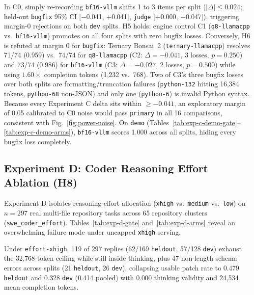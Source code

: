 \documentclass[conference]{IEEEtran}
\begin{document}
In C0, simply re-recording \texttt{bf16-{}vllm} shifts 1 to 3 items per split ($|\Delta| \le 0.024$; held-out \texttt{bugfix} 95\% CI [$-$0.041, +0.041], \texttt{judge} [+0.000, +0.047]), triggering margin-0 rejections on both \texttt{dev} splits. H5 holds: engine control C1 (\texttt{q8-{}llamacpp} vs.\ \texttt{bf16-{}vllm}) promotes on all four splits with zero bugfix losses. Conversely, H6 is refuted at margin 0 for \texttt{bugfix}: Ternary Bonsai~2 (\texttt{ternary-{}llamacpp}) resolves 71/74 (0.959) vs.\ 74/74 for \texttt{q8-{}llamacpp} (C2: $\Delta=-0.041$, 3 losses, $p=0.250$) and 73/74 (0.986) for \texttt{bf16-{}vllm} (C3: $\Delta=-0.027$, 2 losses, $p=0.500$) while using $1.60\times$ completion tokens (1,232 vs.\ 768). Two of C3's three bugfix losses over both splits are formatting/truncation failures (\texttt{python-{}132} hitting 16,384 tokens, \texttt{python-{}68} non-JSON) and only one (\texttt{python-{}6}) is invalid Python syntax. Because every Experiment C delta sits within $\ge -0.041$, an exploratory margin of 0.05 calibrated to C0 noise would pass \texttt{primary} in all 16 comparisons, consistent with Fig.~\ref{fig:power-noise}. On \texttt{demo} (Tables~\ref{tab:exp-c-demo-gate}--\ref{tab:exp-c-demo-arms}), \texttt{bf16-{}vllm} scores 1.000 across all splits, hiding every bugfix loss completely.

\subsection{Experiment D: Coder Reasoning Effort Ablation (H8)}
\label{sec:results-expd}

Experiment D isolates reasoning-effort allocation (\texttt{xhigh} vs.\ \texttt{medium} vs.\ \texttt{low}) on $n=297$ real multi-file repository tasks across 65 repository clusters (\texttt{swe\_\allowbreak{}coder\_\allowbreak{}effort}). Tables~\ref{tab:exp-d-gate} and~\ref{tab:exp-d-arms} reveal an overwhelming failure mode under uncapped \texttt{xhigh} serving.





Under \texttt{effort-{}xhigh}, 119 of 297 replies (62/169 \texttt{heldout}, 57/128 \texttt{dev}) exhaust the 32,768-token ceiling while still inside thinking, plus 47 non-length schema errors across splits (21 \texttt{heldout}, 26 \texttt{dev}), collapsing usable patch rate to 0.479 \texttt{heldout} and 0.328 \texttt{dev} (0.414 pooled) with 0.000 thinking validity and 24,534 mean completion tokens.
\end{document}
